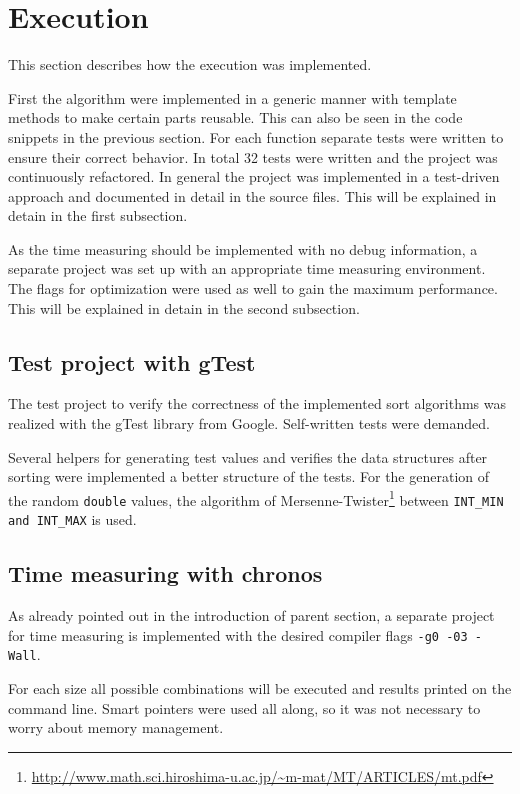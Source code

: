 \documentclass[11pt]{amsart}
\begin{document}
\newpage
\section{Execution}
This section describes how the execution was implemented. 

First the algorithm were implemented in a generic manner with template methods to make certain parts reusable. This can also be seen in the code snippets in the previous section. For each function separate tests were written to ensure their correct behavior. In total 32 tests were written and the project was continuously refactored. In general the project was implemented in a test-driven approach and documented in detail in the source files. This will be explained in detain in the first subsection.

As the time measuring should be implemented with no debug information, a separate project was set up with an appropriate time measuring environment. The flags for optimization were used as well to gain the maximum performance. This will be explained in detain in the second subsection.

%
%
\subsection{Test project with gTest}
The test project to verify the correctness of the implemented sort algorithms was realized with the gTest library from Google. Self-written tests were demanded. 

Several helpers for generating test values and verifies the data structures after sorting were implemented a better structure of the tests. For the generation of the random \texttt{double} values, the algorithm of Mersenne-Twister\footnote{\url{http://www.math.sci.hiroshima-u.ac.jp/~m-mat/MT/ARTICLES/mt.pdf}} between \texttt{INT\_MIN and INT\_MAX} is used.
%
%
\subsection{Time measuring with chronos}
As already pointed out in the introduction of parent section, a separate project for time measuring is implemented with the desired compiler flags \texttt{-g0 -03 -Wall}. 

For each size all possible combinations will be executed and results printed on the command line. Smart pointers were used all along, so it was not necessary to worry about memory management.
\end{document}
